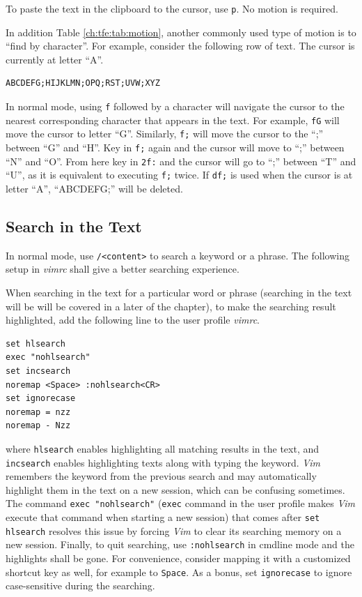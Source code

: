 To paste the text in the clipboard to the cursor, use \verb|p|. No motion is required.

In addition Table \ref{ch:tfe:tab:motion}, another commonly used type of motion is to ``find by character''. For example, consider the following row of text. The cursor is currently at letter ``A''.
\begin{lstlisting}
ABCDEFG;HIJKLMN;OPQ;RST;UVW;XYZ
\end{lstlisting}
In normal mode, using \verb|f| followed by a character will navigate the cursor to the nearest corresponding character that appears in the text. For example, \verb|fG| will move the cursor to letter ``G''. Similarly, \verb|f;| will move the cursor to the ``;'' between ``G'' and ``H''. Key in \verb|f;| again and the cursor will move to ``;'' between ``N'' and ``O''. From here key in \verb|2f:| and the cursor will go to ``;'' between ``T'' and ``U'', as it is equivalent to executing \verb|f;| twice. If \verb|df;| is used when the cursor is at letter ``A'', ``ABCDEFG;'' will be deleted.

\subsection{Search in the Text}

In normal mode, use \verb|/<content>| to search a keyword or a phrase. The following setup in \textit{vimrc} shall give a better searching experience.

When searching in the text for a particular word or phrase (searching in the text will be will be covered in a later of the chapter), to make the searching result highlighted, add the following line to the user profile \textit{vimrc}.
\begin{lstlisting}
set hlsearch
exec "nohlsearch"
set incsearch
noremap <Space> :nohlsearch<CR>
set ignorecase
noremap = nzz
noremap - Nzz
\end{lstlisting}
where \verb|hlsearch| enables highlighting all matching results in the text, and \verb|incsearch| enables highlighting texts along with typing the keyword. \textit{Vim} remembers the keyword from the previous search and may automatically highlight them in the text on a new session, which can be confusing sometimes. The command \verb|exec "nohlsearch"| (\verb|exec| command in the user profile makes \textit{Vim} execute that command when starting a new session) that comes after \verb|set hlsearch| resolves this issue by forcing \textit{Vim} to clear its searching memory on a new session. Finally, to quit searching, use \verb|:nohlsearch| in cmdline mode and the highlights shall be gone. For convenience, consider mapping it with a customized shortcut key as well, for example to \verb|Space|. As a bonus, set \verb|ignorecase| to ignore case-sensitive during the searching.

